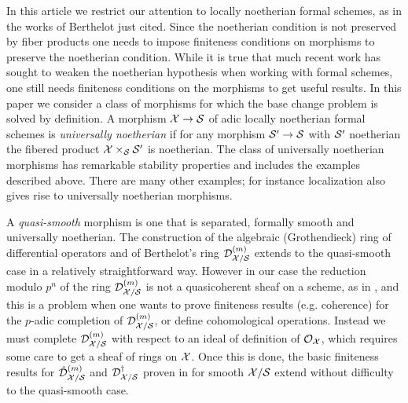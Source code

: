 \documentclass{article}
\theoremstyle{change}
\numberwithin{equation}{subsubsection}
\begin{document}
In this article we restrict our attention to locally noetherian formal
schemes, as in the works of Berthelot just cited. Since the noetherian
condition is not preserved by fiber products one needs to impose
finiteness conditions on morphisms to preserve the noetherian
condition. While it is true that much recent work has sought to weaken
the noetherian hypothesis when working with formal schemes, one still
needs finiteness conditions on the morphisms to get useful results. In
this paper we consider a class of morphisms for which the base change
problem is solved by definition. A morphism ${\cal X}\to{\cal S}$ of adic
locally noetherian formal schemes is \textit{universally noetherian}
if for any morphism ${\cal S}'\to{\cal S}$ with ${\cal S}'$ noetherian the fibered
product ${\cal X}\times_{\cal S}{\cal S}'$ is noetherian. The class of universally
noetherian morphisms has remarkable stability properties and includes
the examples described above. There are many other examples; for
instance localization also gives rise to universally noetherian
morphisms.

A \textit{quasi-smooth} morphism is one that is separated, formally
smooth and universally noetherian. The construction of the algebraic
(Grothendieck) ring of differential operators and of Berthelot's ring
${{\cal D}}^{({m})}_{{\cal X}/{\cal S}}$ extends to the quasi-smooth case in a
relatively straightforward way. However in our case the reduction
modulo $p^n$ of the ring ${{\cal D}}^{({m})}_{{\cal X}/{\cal S}}$ is not a
quasicoherent sheaf on a scheme, as in \cite{berthelot:1996}, and this
is a problem when one wants to prove finiteness results
(e.g. coherence) for the $p$-adic completion of
${{\cal D}}^{({m})}_{{\cal X}/{\cal S}}$, or define cohomological operations. Instead
we must complete ${{\cal D}}^{({m})}_{{\cal X}/{\cal S}}$ with respect to an ideal of
definition of ${\cal O}_{\cal X}$, which requires some care to get a sheaf of
rings on ${\cal X}$. Once this is done, the basic finiteness results for
${\hat{\cal D}}^{({m})}_{{\cal X}/{\cal S}}$ and ${\cal D}^\dagger_{{\cal X}/{\cal S}}$ proven in
\cite{berthelot:1996} for smooth ${\cal X}/{\cal S}$ extend without difficulty
to the quasi-smooth case.
\end{document}
